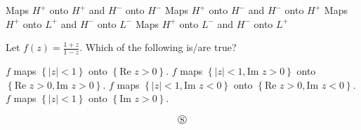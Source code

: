 \documentclass[10pt]{exam}
\newcommand{\set}[1]{\ensuremath{\left \{ {#1} \right \}}}
\begin{document}
\begin{questions}
\begin{checkboxes}
\choice Maps $H^+$ onto $H^+$ and $H^-$ onto $H^-$ 
\choice Maps $H^+$ onto $H^-$ and $H^-$ onto $H^+$ 
\choice Maps $H^+$ onto $L^+$ and $H^-$ onto $L^-$ 
\choice Maps $H^+$ onto $L^-$ and $H^-$ onto $L^+$ 
\end{checkboxes}

\question 
Let $f(z) = \frac{1+z}{1-z}$. Which of the following is/are true?

\begin{checkboxes}
\choice $f$ maps $\set{|z| < 1}$ onto $\set{\mbox{Re } z >0}$.
\choice $f$ maps $\set{|z| < 1, \mbox{Im } z > 0}$ onto $\set{\mbox{Re } z >0, \mbox{Im }z > 0}$.
\choice $f$ maps $\set{|z| < 1, \mbox{Im } z < 0}$ onto $\set{\mbox{Re } z >0, \mbox{Im }z < 0}$.
\choice $f$ maps $\set{|z| < 1}$ onto $\set{\mbox{Im } z >0}$.
\end{checkboxes}





\end{questions}
$$\circledS$$
\end{document}
